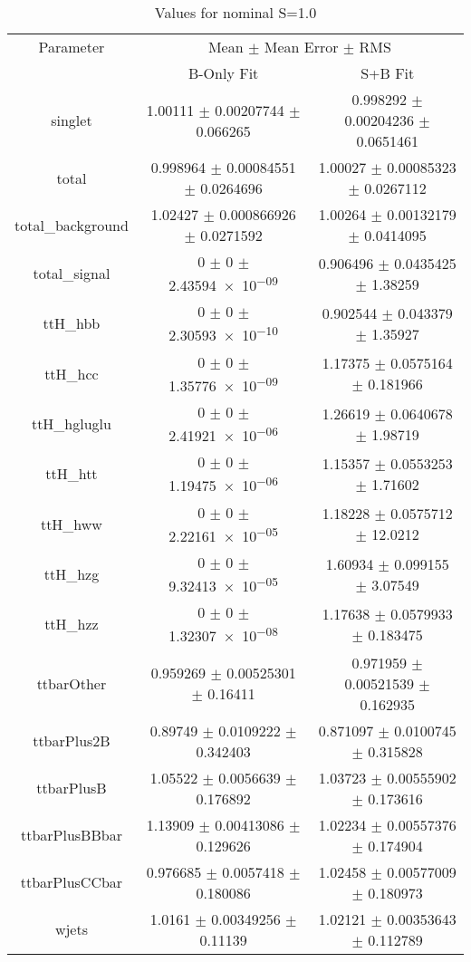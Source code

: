 \begin{table}
\centering
\caption{Values for nominal S=1.0}
\begin{tabular}{ccc}
\toprule
Parameter & \multicolumn{2}{c}{Mean $\pm$ Mean Error $\pm$ RMS}\\
 & B-Only Fit & S+B Fit\\
\midrule
singlet & \num{1.00111} $\pm$ \num{0.00207744} $\pm$ \num{0.066265} & \num{0.998292} $\pm$ \num{0.00204236} $\pm$ \num{0.0651461}\\
total & \num{0.998964} $\pm$ \num{0.00084551} $\pm$ \num{0.0264696} & \num{1.00027} $\pm$ \num{0.00085323} $\pm$ \num{0.0267112}\\
total\_background & \num{1.02427} $\pm$ \num{0.000866926} $\pm$ \num{0.0271592} & \num{1.00264} $\pm$ \num{0.00132179} $\pm$ \num{0.0414095}\\
total\_signal & \num{0} $\pm$ \num{0} $\pm$ \num{2.43594e-09} & \num{0.906496} $\pm$ \num{0.0435425} $\pm$ \num{1.38259}\\
ttH\_hbb & \num{0} $\pm$ \num{0} $\pm$ \num{2.30593e-10} & \num{0.902544} $\pm$ \num{0.043379} $\pm$ \num{1.35927}\\
ttH\_hcc & \num{0} $\pm$ \num{0} $\pm$ \num{1.35776e-09} & \num{1.17375} $\pm$ \num{0.0575164} $\pm$ \num{0.181966}\\
ttH\_hgluglu & \num{0} $\pm$ \num{0} $\pm$ \num{2.41921e-06} & \num{1.26619} $\pm$ \num{0.0640678} $\pm$ \num{1.98719}\\
ttH\_htt & \num{0} $\pm$ \num{0} $\pm$ \num{1.19475e-06} & \num{1.15357} $\pm$ \num{0.0553253} $\pm$ \num{1.71602}\\
ttH\_hww & \num{0} $\pm$ \num{0} $\pm$ \num{2.22161e-05} & \num{1.18228} $\pm$ \num{0.0575712} $\pm$ \num{12.0212}\\
ttH\_hzg & \num{0} $\pm$ \num{0} $\pm$ \num{9.32413e-05} & \num{1.60934} $\pm$ \num{0.099155} $\pm$ \num{3.07549}\\
ttH\_hzz & \num{0} $\pm$ \num{0} $\pm$ \num{1.32307e-08} & \num{1.17638} $\pm$ \num{0.0579933} $\pm$ \num{0.183475}\\
ttbarOther & \num{0.959269} $\pm$ \num{0.00525301} $\pm$ \num{0.16411} & \num{0.971959} $\pm$ \num{0.00521539} $\pm$ \num{0.162935}\\
ttbarPlus2B & \num{0.89749} $\pm$ \num{0.0109222} $\pm$ \num{0.342403} & \num{0.871097} $\pm$ \num{0.0100745} $\pm$ \num{0.315828}\\
ttbarPlusB & \num{1.05522} $\pm$ \num{0.0056639} $\pm$ \num{0.176892} & \num{1.03723} $\pm$ \num{0.00555902} $\pm$ \num{0.173616}\\
ttbarPlusBBbar & \num{1.13909} $\pm$ \num{0.00413086} $\pm$ \num{0.129626} & \num{1.02234} $\pm$ \num{0.00557376} $\pm$ \num{0.174904}\\
ttbarPlusCCbar & \num{0.976685} $\pm$ \num{0.0057418} $\pm$ \num{0.180086} & \num{1.02458} $\pm$ \num{0.00577009} $\pm$ \num{0.180973}\\
wjets & \num{1.0161} $\pm$ \num{0.00349256} $\pm$ \num{0.11139} & \num{1.02121} $\pm$ \num{0.00353643} $\pm$ \num{0.112789}\\
\bottomrule
\end{tabular}
\end{table}